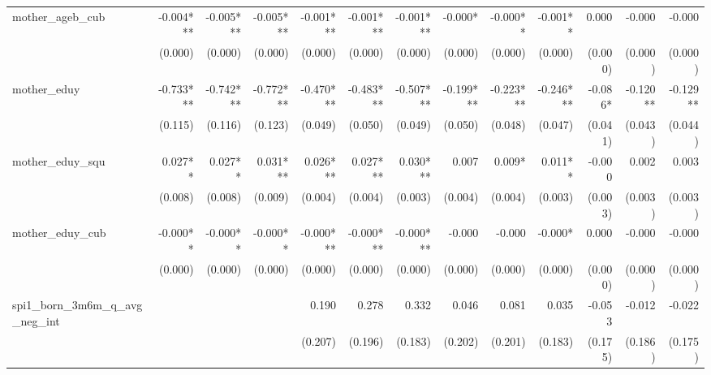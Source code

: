 \begin{tabular}{lrrrrrrrrrrrr}
mother\_ageb\_cub                           &    -0.004*** &    -0.005*** &    -0.005*** &    -0.001*** &    -0.001*** &    -0.001*** &      -0.000* &     -0.000** &     -0.001** &        0.000 &       -0.000 &       -0.000 \\ 
                                            &      (0.000) &      (0.000) &      (0.000) &      (0.000) &      (0.000) &      (0.000) &      (0.000) &      (0.000) &      (0.000) &      (0.000) &      (0.000) &      (0.000) \\ 
mother\_eduy                                &    -0.733*** &    -0.742*** &    -0.772*** &    -0.470*** &    -0.483*** &    -0.507*** &    -0.199*** &    -0.223*** &    -0.246*** &      -0.086* &     -0.120** &     -0.129** \\ 
                                            &      (0.115) &      (0.116) &      (0.123) &      (0.049) &      (0.050) &      (0.049) &      (0.050) &      (0.048) &      (0.047) &      (0.041) &      (0.043) &      (0.044) \\ 
mother\_eduy\_squ                           &      0.027** &      0.027** &     0.031*** &     0.026*** &     0.027*** &     0.030*** &        0.007 &       0.009* &      0.011** &       -0.000 &        0.002 &        0.003 \\ 
                                            &      (0.008) &      (0.008) &      (0.009) &      (0.004) &      (0.004) &      (0.003) &      (0.004) &      (0.004) &      (0.003) &      (0.003) &      (0.003) &      (0.003) \\ 
mother\_eduy\_cub                           &     -0.000** &     -0.000** &     -0.000** &    -0.000*** &    -0.000*** &    -0.000*** &       -0.000 &       -0.000 &      -0.000* &        0.000 &       -0.000 &       -0.000 \\ 
                                            &      (0.000) &      (0.000) &      (0.000) &      (0.000) &      (0.000) &      (0.000) &      (0.000) &      (0.000) &      (0.000) &      (0.000) &      (0.000) &      (0.000) \\ 
spi1\_born\_3m6m\_q\_avg\_neg\_int          &              &              &              &        0.190 &        0.278 &        0.332 &        0.046 &        0.081 &        0.035 &       -0.053 &       -0.012 &       -0.022 \\ 
                                            &              &              &              &      (0.207) &      (0.196) &      (0.183) &      (0.202) &      (0.201) &      (0.183) &      (0.175) &      (0.186) &      (0.175) \\ 

\end{tabular}
